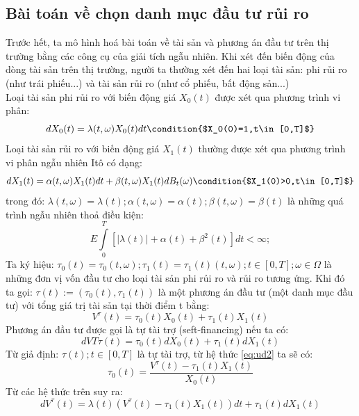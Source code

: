 \documentclass[14pt,a4paper]{article}
\numberwithin{equation}{section}
\begin{document}
\subsection{Bài toán về chọn danh mục đầu tư rủi ro}
Trước hết, ta mô hình hoá bài toán về tài sản và phương án đầu tư trên thị trường bằng các công cụ của giải tích ngẫu nhiên. Khi xét đến biến động của dòng tài sản trên thị trường, người ta thường xét đến hai loại tài sản: phi rủi ro (như trái phiếu...) và tài sản rủi ro (như cổ phiếu, bất động sản...)\\
Loại tài sản phi rủi ro với biến động giá $X_0(t)$ được xét qua phương trình vi phân:
\begin{equation*}
	dX_0(t)=\lambda(t,\omega)X_0(t)dt \condition{$X_0(0)=1,t\in[0,T]$}
\end{equation*}
Loại tài sản rủi ro với biến động giá $X_1(t)$ thường được xét qua phương trình vi phân ngẫu nhiên Itô có dạng:
\begin{equation}\label{eq:ud1}
	dX_1(t)=\alpha(t,\omega)X_1(t)dt+\beta(t,\omega)X_1(t)dB_t(\omega) \condition{$X_1(0)>0,t\in[0,T]$}
\end{equation}
trong đó: $\lambda(t,\omega)=\lambda(t);\alpha(t,\omega)=\alpha(t);\beta(t,\omega)=\beta(t)$ là những quá trình ngẫu nhiên thoả điều kiện:
\begin{equation*}
	E\int\limits_{0}^{T}[|\lambda(t)|+\alpha(t)+\beta^2(t)]dt<\infty;
\end{equation*}
Ta ký hiệu: $\tau_0(t)=\tau_0(t,\omega);\tau_1(t)=\tau_1(t)(t,\omega);t\in[0,T];\omega\in \Omega$ là những đơn vị vốn đầu tư cho loại tài sản phi rủi ro và rủi ro tương ứng. Khi đó ta gọi: $\tau(t):=(\tau_0(t),\tau_1(t))$ là một phương án đầu tư (một danh mục đầu tư) với tổng giá trị tài sản tại thời điểm t bằng:
\begin{equation}\label{eq:ud2}
	V^\tau(t)=\tau_0(t)X_0(t)+\tau_1(t)X_1(t)	
\end{equation}
Phương án đầu tư được gọi là tự tài trợ (seft-financing) nếu ta có:
\begin{equation}\label{eq:ud3}
	dVT\tau(t)=\tau_0(t)dX_0(t)+\tau_1(t)dX_1(t)
\end{equation}
Từ giả định: $\tau(t);t\in[0,T]$ là tự tài trợ, từ hệ thức \eqref{eq:ud2} ta sẽ có:
\begin{equation*}
	\tau_0(t)=\dfrac{V^\tau(t)-\tau_1(t)X_1(t)}{X_0(t)}
\end{equation*}
Từ các hệ thức trên suy ra:
\begin{equation*}
	dV^\tau(t)=\lambda(t)(V^\tau(t)-\tau_1(t)X_1(t))dt+\tau_1(t)dX_1(t)
\end{equation*}
\end{document}
